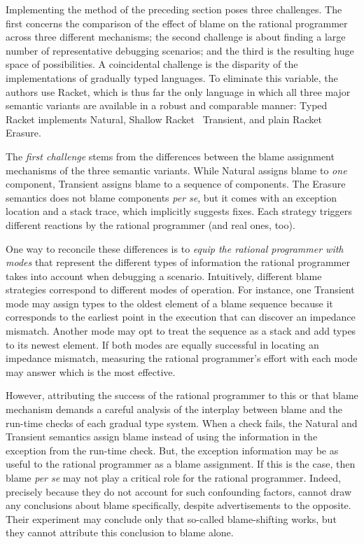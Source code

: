 
Implementing the method of the preceding section poses three challenges.  The
first concerns the comparison of the effect of blame on the rational programmer
across three different mechanisms; the second challenge is about finding a large
number of representative debugging scenarios; and the third is the resulting
huge space of possibilities. A coincidental challenge is the disparity of the
implementations of gradually typed languages. To eliminate this variable, the
authors use Racket, which is thus far the only language in which all three major
semantic variants are available in a robust and comparable manner: Typed Racket
implements Natural, Shallow Racket~\citep{ttt21} Transient, and plain Racket
Erasure.

The {\em first challenge\/} stems from the differences between the blame
assignment mechanisms of the three semantic variants.  While Natural assigns
blame to {\em one\/} component, Transient assigns blame to a sequence of
components. The Erasure semantics does not blame components {\it per se\/}, but
it comes with an exception location and a stack trace, which implicitly suggests
fixes.  Each strategy triggers different reactions by the rational programmer
(and real ones, too).

One way to reconcile these differences is to {\em equip the rational
programmer with modes \/} that represent the different types of
information the rational programmer takes into account when debugging a
scenario. Intuitively, different
blame strategies correspond to different modes of operation.
For instance, one Transient mode may assign types to the oldest element of a
blame sequence because it corresponds to the
earliest point in the execution that can discover an impedance
mismatch.  Another mode may opt to treat the sequence as a stack and add
types to its newest element.  If both modes are equally successful in
locating an impedance mismatch, measuring the rational programmer's effort with each mode
may answer which is the most effective.

However, attributing the success of the rational programmer to this or
that blame mechanism demands a careful analysis of the interplay between blame
and the run-time checks of each gradual type system. When a check fails,
the Natural and Transient semantics assign blame instead of using the
information in the exception from the run-time check. But, the
exception information may be as useful to the rational
programmer as a blame assignment. If this is the case, then blame {\em per se\/} may not play a critical
role for the rational programmer. Indeed, precisely because they do not
account for such confounding factors, \citet{lksfd-popl-2020} cannot draw any
conclusions about blame specifically, despite advertisements to the
opposite. Their experiment may conclude only that so-called blame-shifting
works, but they cannot attribute this conclusion to blame alone. 

